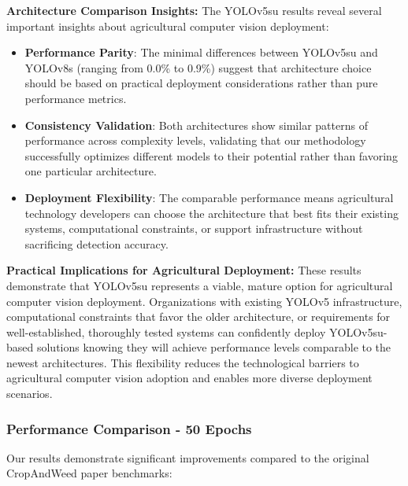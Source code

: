 \textbf{Architecture Comparison Insights:} The YOLOv5su results reveal several important insights about agricultural computer vision deployment:

\begin{itemize}
    \item \textbf{Performance Parity}: The minimal differences between YOLOv5su and YOLOv8s (ranging from 0.0\% to 0.9\%) suggest that architecture choice should be based on practical deployment considerations rather than pure performance metrics.
    
    \item \textbf{Consistency Validation}: Both architectures show similar patterns of performance across complexity levels, validating that our methodology successfully optimizes different models to their potential rather than favoring one particular architecture.
    
    \item \textbf{Deployment Flexibility}: The comparable performance means agricultural technology developers can choose the architecture that best fits their existing systems, computational constraints, or support infrastructure without sacrificing detection accuracy.
\end{itemize}

\textbf{Practical Implications for Agricultural Deployment:} These results demonstrate that YOLOv5su represents a viable, mature option for agricultural computer vision deployment. Organizations with existing YOLOv5 infrastructure, computational constraints that favor the older architecture, or requirements for well-established, thoroughly tested systems can confidently deploy YOLOv5su-based solutions knowing they will achieve performance levels comparable to the newest architectures. This flexibility reduces the technological barriers to agricultural computer vision adoption and enables more diverse deployment scenarios.

\subsubsection{Performance Comparison - 50 Epochs}

Our results demonstrate significant improvements compared to the original CropAndWeed paper benchmarks:

